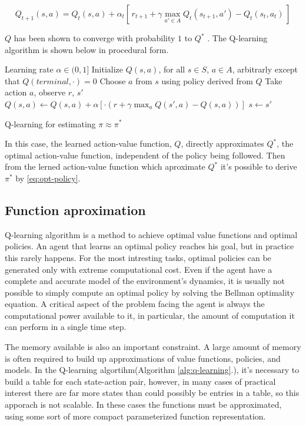 \documentclass{article}
\begin{document}
\begin{equation}
	Q_{t+1}(s, a) = Q_t(s, a) + \alpha_t [\, r_{t+1} + \gamma \max_{a' \in A} Q_t(s_{t+1}, a') - Q_t(s_t, a_t)\,]
\end{equation}

$Q$ has been shown to converge with probability $1$ to $Q^*$ \cite{10.5555/3312046}. The Q-learning algorithm is shown below in procedural form.

\begin{algorithm}[H]
	\begin{algorithmic}
		\Require
		\Statex Learning rate $\alpha \in (0, 1]$
		\State Initialize $Q(s,a)$, for all $s \in S$, $a \in A$, arbitrarly except that $Q(terminal, \cdot ) = 0$
		\State Choose $a$ from $s$ using policy derived from $Q$
		\State Take action $a$, observe $r$, $s'$
		\State $Q(s, a) \gets Q(s, a) + \alpha [\cdot (r + \gamma  \max_{a} Q(s', a) - Q(s,a))]$
		\State $s \gets s'$
		\EndWhile
		\EndProcedure
	\end{algorithmic}
	\caption{Q-learning for estimating $\pi \approx \pi^*$}
	\label{alg:q-learning}
\end{algorithm}

In this case, the learned action-value function, $Q$, directly approximates $Q^*$, the optimal action-value function, independent of the policy being followed. Then from the lerned action-value function which aproximate $Q^*$ it's possible to derive $\pi^*$ by \autoref{eq:opt-policy}.

\subsection{Function aproximation}
Q-learning algorithm is a method to achieve optimal value functions and optimal policies. An agent that learns an optimal policy reaches his goal, but in practice this rarely happens. For the most intresting tasks, optimal policies can be generated only with extreme computational cost. Even if the agent have a complete and accurate model of the environment’s dynamics, it is usually not possible to simply compute an optimal policy by solving the Bellman optimality equation. A critical aspect of the problem facing the agent is always the computational power available to it, in particular, the amount of computation it can perform in a single time step.

The memory available is also an important constraint. A large amount of memory is often required to build up approximations of value functions, policies, and models. In the Q-learning algortihm(Algorithm \ref{alg:q-learning}.), it's necessary to build a table for each state-action pair, however, in many cases of practical interest there are far more states than could possibly be entries in a table, so this apporach is not scalable. In these cases the functions must be approximated, using some sort of more compact parameterized function representation.
\end{document}
